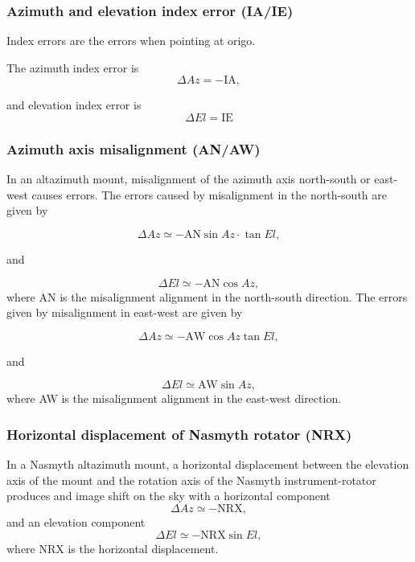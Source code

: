 \subsubsection{Azimuth and elevation index error (IA/IE)}
Index errors are the errors when pointing at origo.

The azimuth index error is 
\begin{equation}
    \Delta Az = -\text{IA},
\end{equation}

and elevation index error is
\begin{equation}\label{eq:pmodel_ie}
    \Delta El = \text{IE}
\end{equation}

\subsubsection{Azimuth axis misalignment (AN/AW)} 

In an altazimuth mount, misalignment of the azimuth axis north-south or east-west causes errors.
The errors caused by misalignment in the north-south are given by

\begin{equation}
    \Delta Az \simeq - \text{AN} \sin{Az} \cdot \tan{El},
\end{equation}

and

\begin{equation}
    \Delta El \simeq - \text{AN} \cos{Az},
\end{equation}
where AN is the misalignment alignment in the north-south direction.
The errors given by misalignment in east-west are given by

\begin{equation}
    \Delta Az \simeq - \text{AW} \cos{Az} \tan{El},
\end{equation}

and

\begin{equation}
    \Delta El \simeq \text{AW} \sin{Az},
\end{equation}
where AW is the misalignment alignment in the east-west direction.

\subsubsection{Horizontal displacement of Nasmyth rotator (NRX)}
In a Nasmyth altazimuth mount, a horizontal displacement between the elevation axis of the mount and the rotation axis of the Nasmyth instrument-rotator produces
and image shift on the sky with a horizontal component
\begin{equation}
    \Delta Az \simeq - \text{NRX},
\end{equation}
and an elevation component
\begin{equation}
    \Delta El \simeq - \text{NRX} \sin{El},
\end{equation}
where NRX is the horizontal displacement.




